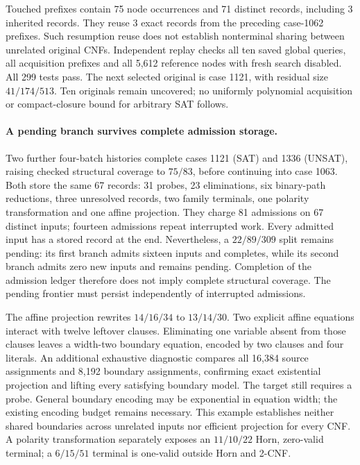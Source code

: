 \documentclass[11pt,a4paper]{article}
\numberwithin{equation}{section}
\theoremstyle{plain}
\theoremstyle{definition}
\theoremstyle{remark}
\begin{document}
Touched prefixes contain 75 node occurrences and 71 distinct records,
including 3 inherited records. They reuse 3 exact records from the preceding
case-1062 prefixes. Such resumption reuse does not establish nonterminal sharing
between unrelated original CNFs. Independent replay checks all ten saved global
queries, all acquisition prefixes and all 5,612 reference nodes with fresh search
disabled. All 299 tests pass. The next selected original is case 1121, with
residual size $41/174/513$. Ten originals remain uncovered; no uniformly
polynomial acquisition or compact-closure bound for arbitrary SAT follows.

\paragraph{A pending branch survives complete admission storage.}
Two further four-batch histories complete cases 1121 (SAT) and 1336 (UNSAT),
raising checked structural coverage to $75/83$, before continuing into case 1063.
Both store the same 67 records: 31 probes, 23 eliminations, six binary-path
reductions, three unresolved records, two family terminals, one polarity
transformation and one affine projection. They charge 81 admissions on 67
distinct inputs; fourteen admissions repeat interrupted work. Every admitted
input has a stored record at the end. Nevertheless, a $22/89/309$ split remains
pending: its first branch admits sixteen inputs and completes, while its second
branch admits zero new inputs and remains pending. Completion of the admission ledger
therefore does not imply complete structural coverage. The pending frontier
must persist independently of interrupted admissions.

The affine projection rewrites $14/16/34$ to $13/14/30$. Two explicit affine
equations interact with twelve leftover clauses. Eliminating one variable absent
from those clauses leaves a width-two boundary equation, encoded by two clauses
and four literals. An additional exhaustive diagnostic compares all 16,384 source
assignments and 8,192 boundary assignments, confirming exact existential
projection and lifting every satisfying boundary model. The target still requires
a probe. General boundary encoding may be exponential in equation width; the
existing encoding budget remains necessary. This example establishes neither
shared boundaries across unrelated inputs nor efficient projection for every CNF.
A polarity transformation separately exposes an $11/10/22$ Horn, zero-valid
terminal; a $6/15/51$ terminal is one-valid outside Horn and 2-CNF.
\end{document}

